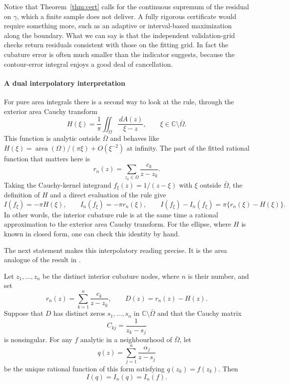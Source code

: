 \documentclass[onefignum,onetabnum]{siamart220329}
\newcommand{\C}{\mathbb{C}}
\newcommand{\dA}{\,dA}
\begin{document}
Notice that Theorem~\ref{thm:cert} calls for the continuous supremum of
the residual on $\gamma$, which a finite sample does not deliver. A
fully rigorous certificate would require something more, such as an
adaptive or interval-based maximization along the boundary. What we can
say is that the independent validation-grid checks return residuals
consistent with those on the fitting grid. In fact the cubature error is
often much smaller than the indicator suggests, because the
contour-error integral enjoys a good deal of cancellation.


\paragraph{A dual interpolatory interpretation}
For pure area integrals there is a second way to look at the rule,
through the exterior area Cauchy transform
\[
   H(\xi) = \frac{1}{\pi}\iint_\Omega \frac{\dA(z)}{\xi-z},
   \qquad \xi \in \C \setminus \bar\Omega .
\]
This function is analytic outside $\bar\Omega$ and behaves like
$H(\xi)=\operatorname{area}(\Omega)/(\pi\xi)+O(\xi^{-2})$ at infinity.
The part of the fitted rational function that matters here is
\[
   r_n(z) = \sum_{z_k\in\Omega} \frac{c_k}{z-z_k}.
\]
Taking the Cauchy-kernel integrand $f_\xi(z)=1/(z-\xi)$ with $\xi$
outside $\bar\Omega$, the definition of $H$ and a direct evaluation of
the rule give
\begin{equation}
\label{eq:dual-cauchy}
   I(f_\xi) = -\pi H(\xi), \qquad
   I_n(f_\xi) = -\pi r_n(\xi), \qquad
   I(f_\xi)-I_n(f_\xi)=\pi\{r_n(\xi)-H(\xi)\}.
\end{equation}
In other words, the interior cubature rule is at the same time a
rational approximation to the exterior area Cauchy transform. For the
ellipse, where $H$ is known in closed form, one can check this identity
by hand.

The next statement makes this interpolatory reading precise. It is the
area analogue of the result in \cite[Section~11]{HorningTrefethen2026}.

\begin{proposition}
\label{prop:dual}
Let $z_1,\ldots,z_n$ be the distinct interior cubature nodes, where
$n$ is their number, and set
\[
  r_n(z)=\sum_{k=1}^n\frac{c_k}{z-z_k},
  \qquad D(z)=r_n(z)-H(z).
\]
Suppose that $D$ has distinct zeros $s_1,\ldots,s_n$ in
$\C\setminus\bar\Omega$ and that the Cauchy matrix
\[
  C_{kj}=\frac{1}{z_k-s_j}
\]
is nonsingular. For any $f$ analytic in a neighbourhood of
$\bar\Omega$, let
\[
  q(z)=\sum_{j=1}^n\frac{\alpha_j}{z-s_j}
\]
be the unique rational function of this form satisfying
$q(z_k)=f(z_k)$. Then
\[
  I(q)=I_n(q)=I_n(f).
\]
\end{proposition}
\end{document}
